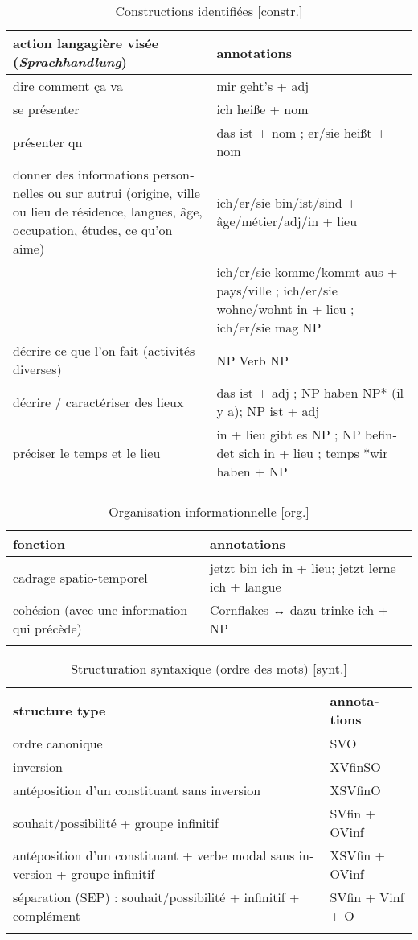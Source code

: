 \documentclass[output=paper]{langscibook}
\begin{document}
\begin{otherlanguage}{french}
\begin{table}[H]
\caption{Constructions identifiées [constr.]}
\begin{tabularx}{\textwidth}{QQ}
\lsptoprule
action langagière visée (\textit{Sprachhandlung}) & annotations\\\midrule
dire comment ça va & mir geht’s + adj\\
se présenter & ich heiße + nom\\
présenter qn & das ist + nom ; er/sie heißt + nom\\
donner des informations personnelles ou sur autrui (origine, ville ou lieu de résidence, langues, âge, occupation, études, ce qu’on aime) & ich/er/sie bin/ist/sind + âge/métier/adj/in + lieu\\\addlinespace
& ich/er/sie komme/kommt aus + pays/ville ; ich/er/sie wohne/wohnt in + lieu ; ich/er/sie mag NP\\\addlinespace
décrire ce que l’on fait (activités diverses) & NP Verb NP\\\addlinespace
décrire / caractériser des lieux & das ist + adj ; NP haben NP* (il y a); NP ist + adj\\\addlinespace
préciser le temps et le lieu & in + lieu gibt es NP ; NP befindet sich in + lieu ; temps *wir haben + NP\\
\lspbottomrule
\end{tabularx}
\end{table}

\begin{table}
\caption{Organisation informationnelle  [org.]}
\begin{tabularx}{\textwidth}{QQ}
\lsptoprule
fonction & annotations\\\midrule
cadrage spatio-temporel & jetzt bin ich in + lieu; jetzt lerne ich + langue\\
cohésion (avec une information qui précède) & Cornflakes ↔ dazu trinke ich  + NP\\
\lspbottomrule
\end{tabularx}
\end{table}

\begin{table}
\caption{Structuration syntaxique (ordre des mots) [synt.]}
\begin{tabularx}{\textwidth}{Ql}
\lsptoprule
structure type & annotations\\\midrule
ordre canonique & SVO\\
inversion & XVfinSO\\
antéposition d’un constituant sans inversion & XSVfinO\\
souhait/possibilité + groupe infinitif & SVfin + OVinf\\
antéposition d’un constituant + verbe modal sans inversion + groupe infinitif & XSVfin + OVinf\\
séparation (SEP) : souhait/possibilité + infinitif + complément & SVfin + Vinf + O\\
\lspbottomrule
\end{tabularx}
\end{table}


\end{otherlanguage}
\end{document}
